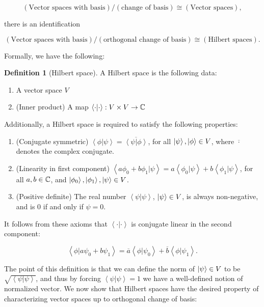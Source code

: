 \documentclass{article}
\theoremstyle{definition}
\newtheorem*{definition}{Definition}
\numberwithin{figure}{section}
\begin{document}
$$
\left(\text{Vector spaces with basis}\right)/\left(\text{change of basis}\right)\cong
\left(\text{Vector spaces}\right),
$$

there is an identification

$$
\left(\text{Vector spaces with basis}\right)/\left(\text{orthogonal change of basis}\right)\cong
\left(\text{Hilbert spaces}\right).
$$

Formally, we have the following:

\begin{definition}[Hilbert space] A Hilbert space is the following data:

\begin{enumerate}
\item A vector space $V$
\item (Inner product) A map $\left<\cdot |\cdot \right>:V\times V\to \mathbb{C}$
\end{enumerate}

Additionally, a Hilbert space is required to satisfy the following properties:

\begin{enumerate}
\item (Conjugate symmetric) $\left<\phi |\psi \right>=\overline{\left<\psi| \phi\right>}$, for all $\left|\psi\right>,\left|\phi\right>\in V$, where $\overline{\cdot}$ denotes the complex conjugate.
\item (Linearity in first component) $\left<a\phi_0+b\phi_1|\psi\right>=a\left<\phi_0|\psi\right>+b\left<\phi_1|\psi\right>$, for all $a,b\in \mathbb{C}$, and $\left|\phi_0\right>,\left|\phi_1\right>,\left|\psi\right>\in V$.
\item (Positive definite) The real number $\left<\psi|\psi\right>$, $\left|\psi\right>\in V$, is always non-negative, and is $0$ if and only if $\psi=0$.
\end{enumerate}

\raggedleft\qedsymbol{}
\end{definition}

It follows from these axioms that $\left<\cdot | \cdot \right>$ is conjugate linear in the second component:

$$\left<\phi|a\psi_0+b\psi_1\right>=\overline{a}\left<\phi|\psi_0\right>+\overline{b}\left<\phi|\psi_1\right>.$$

The point of this definition is that we can define the norm of $\left|\psi\right>\in V$ to be $\sqrt{\left<\psi|\psi\right>}$, and thus by forcing $\left<\psi |\psi\right>=1$ we have a well-defined notion of normalized vector. We now show that Hilbert spaces have the desired property of characterizing vector spaces up to orthogonal change of basis:
\end{document}
